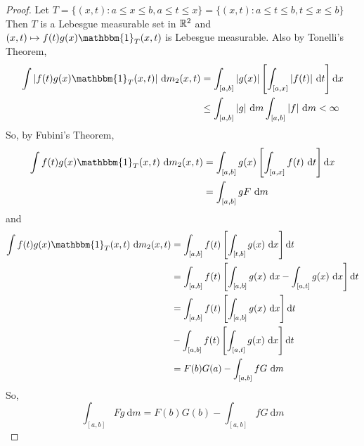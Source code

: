 \begin{proof}
  Let $T = \{(x, t) : a \le x \le b, a \le t \le x\} = \{(x, t) : a \le t \le b, t \le x \le b\}$
  Then $T$ is a Lebesgue measurable set in $\mathbb R^2$ and $(x, t) \mapsto f(t)g(x) \mathbbm{1}_T(x, t)$ is Lebesgue measurable. 
  Also by Tonelli's Theorem, 
  \begin{align*}
    \int |f(t)g(x) \mathbbm{1}_T(x, t)| \ \mathrm{d}m_2(x, t) &= \int_{[a, b]} |g(x)|\left[\int_{[a, x]}|f(t)|\ \mathrm{d}t\right] \mathrm{d}x \\
    &\le \int_{[a, b]} |g| \ \mathrm{d}m \int_{[a, b]} |f| \ \mathrm{d}m < \infty
  \end{align*}
  So, by Fubini's Theorem,
  \begin{align*}
    \int f(t) g(x) \mathbbm{1}_T(x, t) \ \mathrm{d}m_2(x, t) &= \int_{[a, b]}g(x) \left[\int_{[a, x]} f(t) \ \mathrm{d}t\right] \mathrm{d}x \\
    &= \int_{[a, b]} gF \ \mathrm{d}m
  \end{align*}
  and 
  \begin{align*}
    \int f(t)g(x)\mathbbm{1}_T(x, t) \ \mathrm{d}m_2(x, t) &= \int_{[a, b]} f(t) \left[\int_{[t, b]} g(x) \ \mathrm{d}x\right] \mathrm{d}t \\
    &= \int_{[a, b]} f(t) \left[\int_{[a, b]} g(x) \ \mathrm{d}x - \int_{[a, t]} g(x) \ \mathrm{d}x\right]\mathrm{d}t \\
    &= \int_{[a, b]} f(t) \left[ \int_{[a, b]} g(x) \ \mathrm{d}x \right]\mathrm{d}t \\
    &- \int_{[a, b]} f(t) \left[ \int_{[a, t]} g(x) \ \mathrm{d}x \right]\mathrm{d}t \\
    &= F(b)G(a) - \int_{[a, b]} fG \ \mathrm{d}m 
  \end{align*}
  So,
  \[\int_{[a, b]} Fg \ \mathrm{d}m = F(b)G(b) - \int_{[a, b]} fG \ \mathrm{d}m\]
\end{proof}